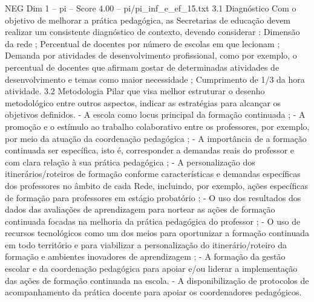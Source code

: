 \begin{textsample}{NEG Dim 1 – pi – Score 4.00 – pi/pi\_inf\_e\_ef\_15.txt}  \label{ex:f1_neg_236}
3.1 Diagnóstico Com o objetivo de melhorar a prática pedagógica, as Secretarias de educação devem realizar um consistente diagnóstico de contexto, devendo considerar : Dimensão da rede ; Percentual de docentes por número de escolas em que lecionam ; Demanda por atividades de desenvolvimento profissional, como por exemplo, o percentual de docentes que afirmam gostar de determinadas atividades de desenvolvimento e temas como maior necessidade ; Cumprimento de 1/3 da hora atividade. 3.2 Metodologia Pilar que visa melhor estruturar o desenho metodológico entre outros aspectos, indicar as estratégias para alcançar os objetivos definidos. - A escola como locus principal da formação continuada ; - A promoção e o estímulo ao trabalho colaborativo entre os professores, por exemplo, por meio da atuação da coordenação pedagógica ; - A importância de a formação continuada ser específica, isto é, corresponder a demandas reais do professor e com clara relação à sua prática pedagógica ; - A personalização dos itinerários/roteiros de formação conforme características e demandas específicas dos professores no âmbito de cada Rede, incluindo, por exemplo, ações específicas de formação para professores em estágio probatório ; - O uso dos resultados dos dados das avaliações de aprendizagem para nortear as ações de formação continuada focadas na melhoria da prática pedagógica do professor ; - O uso de recursos tecnológicos como um dos meios para oportunizar a formação continuada em todo território e para viabilizar a personalização do itinerário/roteiro da formação e ambientes inovadores de aprendizagem ; - A formação da gestão escolar e da coordenação pedagógica para apoiar e/ou liderar a implementação das ações de formação continuada na escola. - A disponibilização de protocolos de acompanhamento da prática docente para apoiar os coordenadores pedagógicos.

\end{textsample}
